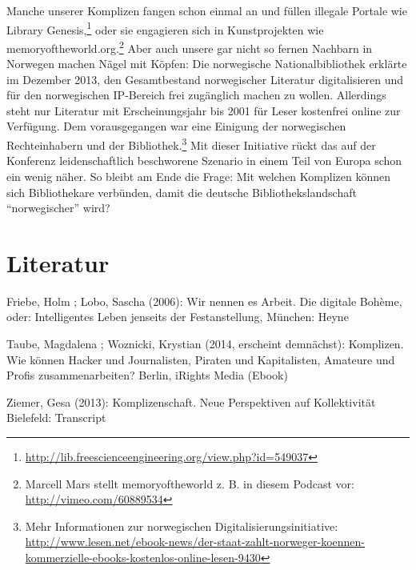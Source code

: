 \documentclass[a4paper,
fontsize=11pt,
oneside,
numbers=noperiodatend,
parskip=half-,
bibliography=totoc,
final
]{scrartcl}
\begin{document}
Manche unserer Komplizen fangen schon einmal an und füllen illegale
Portale wie Library Genesis,\footnote{\url{http://lib.freescienceengineering.org/view.php?id=549037}}
oder sie engagieren sich in Kunstprojekten wie
memoryoftheworld.org.\footnote{Marcell Mars stellt memoryoftheworld z.
  B. in diesem Podcast vor: \url{http://vimeo.com/60889534}} Aber auch
unsere gar nicht so fernen Nachbarn in Norwegen machen Nägel mit Köpfen:
Die norwegische Nationalbibliothek erklärte im Dezember 2013, den
Gesamtbestand norwegischer Literatur digitalisieren und für den
norwegischen IP-Bereich frei zugänglich machen zu wollen. Allerdings
steht nur Literatur mit Erscheinungsjahr bis 2001 für Leser kostenfrei
online zur Verfügung. Dem vorausgegangen war eine Einigung der
norwegischen Rechteinhabern und der Bibliothek.\footnote{Mehr
  Informationen zur norwegischen Digitalisierungsinitiative:
  \url{http://www.lesen.net/ebook-news/der-staat-zahlt-norweger-koennen-kommerzielle-ebooks-kostenlos-online-lesen-9430}}
Mit dieser Initiative rückt das auf der Konferenz leidenschaftlich
beschworene Szenario in einem Teil von Europa schon ein wenig näher. So
bleibt am Ende die Frage: Mit welchen Komplizen können sich
Bibliothekare verbünden, damit die deutsche Bibliothekslandschaft
\enquote{norwegischer} wird?

\section*{Literatur}\label{literatur}

Friebe, Holm ; Lobo, Sascha (2006): Wir nennen es Arbeit. Die digitale
Bohème, oder: Intelligentes Leben jenseits der Festanstellung, München:
Heyne

Taube, Magdalena ; Woznicki, Krystian (2014, erscheint demnächst):
Komplizen. Wie können Hacker und Journalisten, Piraten und Kapitalisten,
Amateure und Profis zusammenarbeiten? Berlin, iRights Media (Ebook)

Ziemer, Gesa (2013): Komplizenschaft. Neue Perspektiven auf
Kollektivität Bielefeld: Transcript
\end{document}
